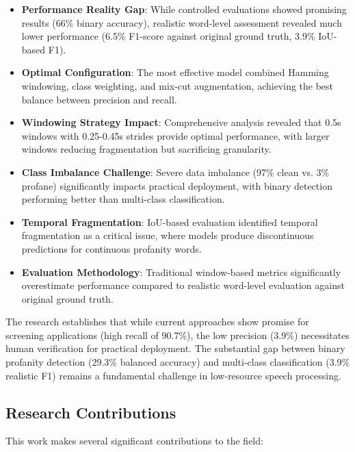 \documentclass[11pt]{article}
\begin{document}
\begin{itemize}
    \item \textbf{Performance Reality Gap}: While controlled evaluations showed promising results (66\% binary accuracy), realistic word-level assessment revealed much lower performance (6.5\% F1-score against original ground truth, 3.9\% IoU-based F1).
    
    \item \textbf{Optimal Configuration}: The most effective model combined Hamming windowing, class weighting, and mix-cut augmentation, achieving the best balance between precision and recall.
    
    \item \textbf{Windowing Strategy Impact}: Comprehensive analysis revealed that 0.5s windows with 0.25-0.45s strides provide optimal performance, with larger windows reducing fragmentation but sacrificing granularity.
    
    \item \textbf{Class Imbalance Challenge}: Severe data imbalance (97\% clean vs. 3\% profane) significantly impacts practical deployment, with binary detection performing better than multi-class classification.
    
    \item \textbf{Temporal Fragmentation}: IoU-based evaluation identified temporal fragmentation as a critical issue, where models produce discontinuous predictions for continuous profanity words.
    
    \item \textbf{Evaluation Methodology}: Traditional window-based metrics significantly overestimate performance compared to realistic word-level evaluation against original ground truth.
\end{itemize}

The research establishes that while current approaches show promise for screening applications (high recall of 90.7\%), the low precision (3.9\%) necessitates human verification for practical deployment. The substantial gap between binary profanity detection (29.3\% balanced accuracy) and multi-class classification (3.9\% realistic F1) remains a fundamental challenge in low-resource speech processing.

\subsection{Research Contributions}
This work makes several significant contributions to the field:
\end{document}
